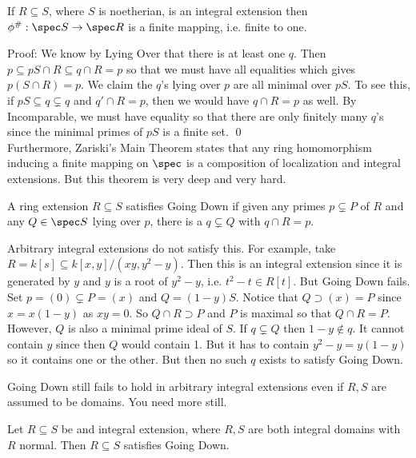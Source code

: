 \begin{prop}
If $R \subseteq S$, where $S$ is noetherian, is an integral extension then $\phi^\#: \spec S \to \spec R$ is a finite mapping, i.e. finite to one. 
\end{prop}

\noindent Proof: We know by Lying Over that there is at least one $q$. Then $p \subseteq pS \cap R \subseteq q \cap R=p$ so that we must have all equalities which gives $p(S \cap R)=p$. We claim the $q$'s lying over $p$ are all minimal over $pS$. To see this, if $pS \subseteq q \subsetneq q$ and $q' \cap R=p$, then we would have $q \cap R=p$ as well. By Incomparable, we must have equality so that there are only finitely many $q$'s since the minimal primes of $pS$ is a finite set. \qed \\

Furthermore, Zariski's Main Theorem states that any ring homomorphism inducing a finite mapping on $\spec$ is a composition of localization and integral extensions. But this theorem is very deep and very hard. 

\begin{dfn}
A ring extension $R \subseteq S$ satisfies Going Down if given any primes $p \subsetneq P$ of $R$ and any $Q \in \spec S$ lying over $p$, there is a $q \subsetneq Q$ with $q \cap R=p$. 
\end{dfn}

\begin{rem}
Arbitrary integral extensions do not satisfy this. For example, take $R=k[s] \subseteq k[x,y]/(xy,y^2-y)$. Then this is an integral extension since it is generated by $y$ and $y$ is a root of $y^2-y$, i.e. $t^2-t \in R[t]$. But Going Down fails. Set $p=(0) \subsetneq P=(x)$ and $Q=(1-y)S$. Notice that $Q \supset (x)=P$ since $x=x(1-y)$ as $xy=0$. So $Q \cap R \supset P$ and $P$ is maximal so that $Q \cap R=P$. However, $Q$ is also a minimal prime ideal of $S$. If $q \subsetneq Q$ then $1-y \notin q$. It cannot contain $y$ since then $Q$ would contain 1. But it has to contain $y^2-y=y(1-y)$ so it contains one or the other. But then no such $q$ exists to satisfy Going Down. 
\end{rem}

\begin{rem}
Going Down still fails to hold in arbitrary integral extensions even if $R,S$ are assumed to be domains. You need more still.
\end{rem}

\begin{thmm}
Let $R \subseteq S$ be and integral extension, where $R,S$ are both integral domains with $R$ normal. Then $R \subseteq S$ satisfies Going Down.
\end{thmm}

